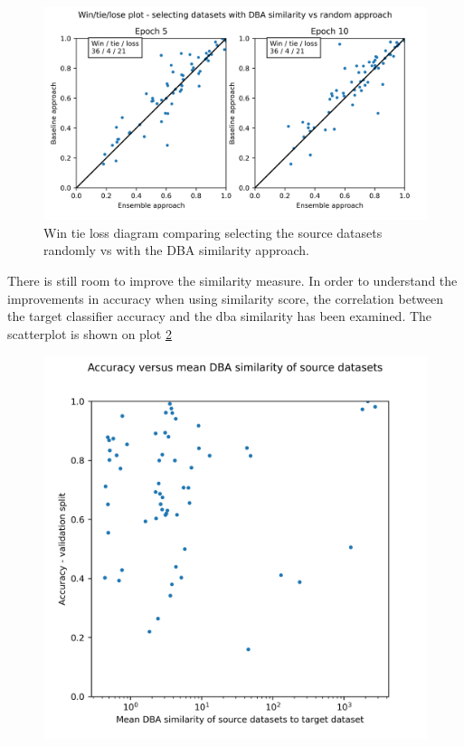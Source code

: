\documentclass[a4paper,11pt,twoside]{report}
\theoremstyle{definition}
\begin{document}
\FloatBarrier
\begin{figure}[h!t]
\centering
\includegraphics[width=17cm]{imgs/dba_vs_random/win_tie_lose_epoch.png}
\caption{Win tie loss diagram comparing selecting the source datasets randomly vs with the DBA similarity approach.}
\label{fig:random_vs_dba_win_tie_loss}
\end{figure}
\FloatBarrier
There is still room to improve the similarity measure. In order to understand the improvements in accuracy when using similarity score, the correlation between the target classifier accuracy and the dba similarity has been examined. The scatterplot is shown on plot \ref{fig:acc_vs_dba_sim}
\FloatBarrier
\begin{figure}[h!t]
\centering
\includegraphics[width=17cm]{imgs/ensemble/accuracy_vs_mean_dba_sim.png}
\caption{}
\label{fig:acc_vs_dba_sim}
\end{figure}
\FloatBarrier
\end{document}
